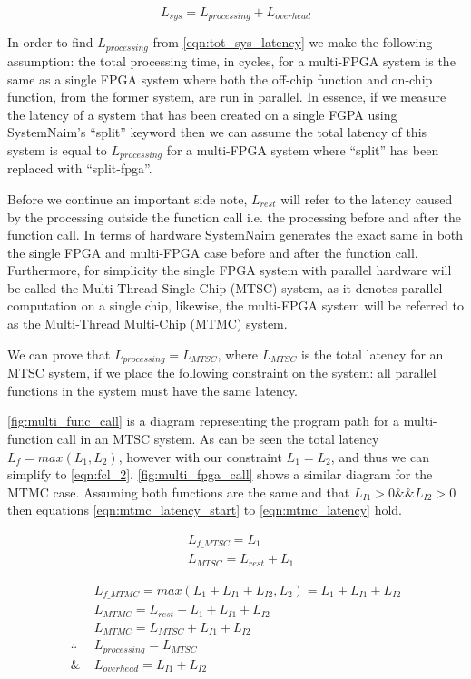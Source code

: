 \begin{equation}
    L_{sys} = L_{processing} + L_{overhead}
    \label{eqn:tot_sys_latency}
\end{equation}

In order to find $L_{processing}$ from \autoref{eqn:tot_sys_latency} we make the following assumption: the total processing time, in cycles, for a multi-FPGA system is the same as a single FPGA system where both the off-chip function and on-chip function, from the former system, are run in parallel. In essence, if we measure the latency of a system that has been created on a single FGPA using SystemNaim's “split” keyword then we can assume the total latency of this system is equal to $L_{processing}$ for a multi-FPGA system where “split” has been replaced with “split-fpga”.

Before we continue an important side note, $L_{rest}$ will refer to the latency caused by the processing outside the function call i.e. the processing before and after the function call. In terms of hardware SystemNaim generates the exact same in both the single FPGA and multi-FPGA case before and after the function call. Furthermore, for simplicity the single FPGA system with parallel hardware will be called the Multi-Thread Single Chip (MTSC) system, as it denotes parallel computation on a single chip, likewise, the multi-FPGA system will be referred to as the Multi-Thread Multi-Chip (MTMC) system. 

We can prove that $L_{processing} = L_{MTSC}$, where $L_{MTSC}$ is the total latency for an MTSC system, if we place the following constraint on the system: all parallel functions in the system must have the same latency.

\autoref{fig:multi_func_call} is a diagram representing the program path for a multi-function call in an MTSC system. As can be seen the total latency $L_f = max(L_1,L_2)$, however with our constraint $L_1 = L_2$, and thus we can simplify to \autoref{eqn:fcl_2}. \autoref{fig:multi_fpga_call} shows a similar diagram for the MTMC case. Assuming both functions are the same and that $L_{I1} > 0 \&\& L_{I2} > 0 $ then equations \ref{eqn:mtmc_latency_start} to \ref{eqn:mtmc_latency} hold. 

\begin{align}
    &L_{f\_MTSC} = L_1 \label{eqn:fcl_1} \\
    &L_{MTSC} = L_{rest} + L_1 \label{eqn:fcl_2}
\end{align}

\begin{align}
    &L_{f\_MTMC} = max(L_1 + L_{I1} + L_{I2} , L_2) = L_1 + L_{I1} + L_{I2} \label{eqn:mtmc_latency_start} \\
    &L_{MTMC} = L_{rest} + L_1 + L_{I1} + L_{I2}  \\
    &L_{MTMC} = L_{MTSC} + L_{I1} + L_{I2} \\
    \therefore \; &L_{processing} = L_{MTSC} \label{eqn:mtsc_processing} \\
    \& \; &L_{overhead} = L_{I1} + L_{I2} 
    \label{eqn:mtmc_latency}
\end{align}

